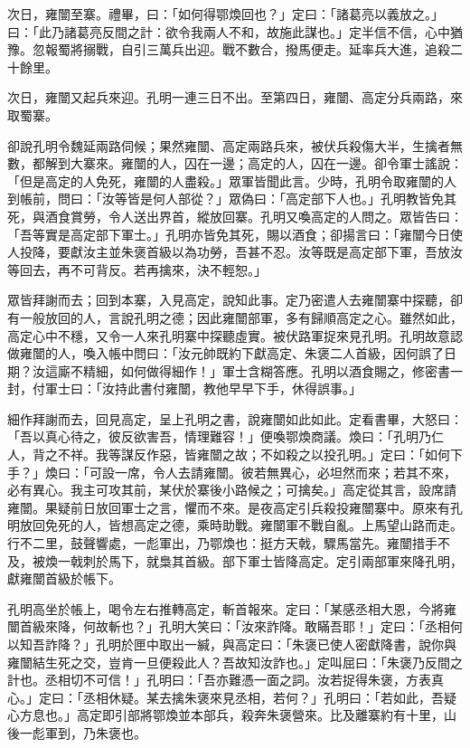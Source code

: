 次日，雍闓至寨。禮畢，曰：「如何得鄂煥回也？」定曰：「諸葛亮以義放之。」曰：「此乃諸葛亮反間之計：欲令我兩人不和，故施此謀也。」定半信不信，心中猶豫。忽報蜀將搦戰，自引三萬兵出迎。戰不數合，撥馬便走。延率兵大進，追殺二十餘里。

次日，雍闓又起兵來迎。孔明一連三日不出。至第四日，雍闓、高定分兵兩路，來取蜀寨。

卻說孔明令魏延兩路伺候；果然雍闓、高定兩路兵來，被伏兵殺傷大半，生擒者無數，都解到大寨來。雍闓的人，囚在一邊；高定的人，囚在一邊。卻令軍士謠說：「但是高定的人免死，雍闓的人盡殺。」眾軍皆聞此言。少時，孔明令取雍闓的人到帳前，問曰：「汝等皆是何人部從？」眾偽曰：「高定部下人也。」孔明教皆免其死，與酒食賞勞，令人送出界首，縱放回寨。孔明又喚高定的人問之。眾皆告曰：「吾等實是高定部下軍士。」孔明亦皆免其死，賜以酒食；卻揚言曰：「雍闓今日使人投降，要獻汝主並朱褒首級以為功勞，吾甚不忍。汝等既是高定部下軍，吾放汝等回去，再不可背反。若再擒來，決不輕恕。」

眾皆拜謝而去；回到本寨，入見高定，說知此事。定乃密遣人去雍闓寨中探聽，卻有一般放回的人，言說孔明之德；因此雍闓部軍，多有歸順高定之心。雖然如此，高定心中不穩，又令一人來孔明寨中探聽虛實。被伏路軍捉來見孔明。孔明故意認做雍闓的人，喚入帳中問曰：「汝元帥既約下獻高定、朱褒二人首級，因何誤了日期？汝這廝不精細，如何做得細作！」軍士含糊答應。孔明以酒食賜之，修密書一封，付軍士曰：「汝持此書付雍闓，教他早早下手，休得誤事。」

細作拜謝而去，回見高定，呈上孔明之書，說雍闓如此如此。定看書畢，大怒曰：「吾以真心待之，彼反欲害吾，情理難容！」便喚鄂煥商議。煥曰：「孔明乃仁人，背之不祥。我等謀反作惡，皆雍闓之故；不如殺之以投孔明。」定曰：「如何下手？」煥曰：「可設一席，令人去請雍闓。彼若無異心，必坦然而來；若其不來，必有異心。我主可攻其前，某伏於寨後小路候之；可擒矣。」高定從其言，設席請雍闓。果疑前日放回軍士之言，懼而不來。是夜高定引兵殺投雍闓寨中。原來有孔明放回免死的人，皆想高定之德，乘時助戰。雍闓軍不戰自亂。上馬望山路而走。行不二里，鼓聲響處，一彪軍出，乃鄂煥也：挺方天戟，驟馬當先。雍闓措手不及，被煥一戟刺於馬下，就梟其首級。部下軍士皆降高定。定引兩部軍來降孔明，獻雍闓首級於帳下。

孔明高坐於帳上，喝令左右推轉高定，斬首報來。定曰：「某感丞相大恩，今將雍闓首級來降，何故斬也？」孔明大笑曰：「汝來詐降。敢瞞吾耶！」定曰：「丞相何以知吾詐降？」孔明於匣中取出一緘，與高定曰：「朱褒已使人密獻降書，說你與雍闓結生死之交，豈肯一旦便殺此人？吾故知汝詐也。」定叫屈曰：「朱褒乃反間之計也。丞相切不可信！」孔明曰：「吾亦難憑一面之詞。汝若捉得朱褒，方表真心。」定曰：「丞相休疑。某去擒朱褒來見丞相，若何？」孔明曰：「若如此，吾疑心方息也。」高定即引部將鄂煥並本部兵，殺奔朱褒營來。比及離寨約有十里，山後一彪軍到，乃朱褒也。

